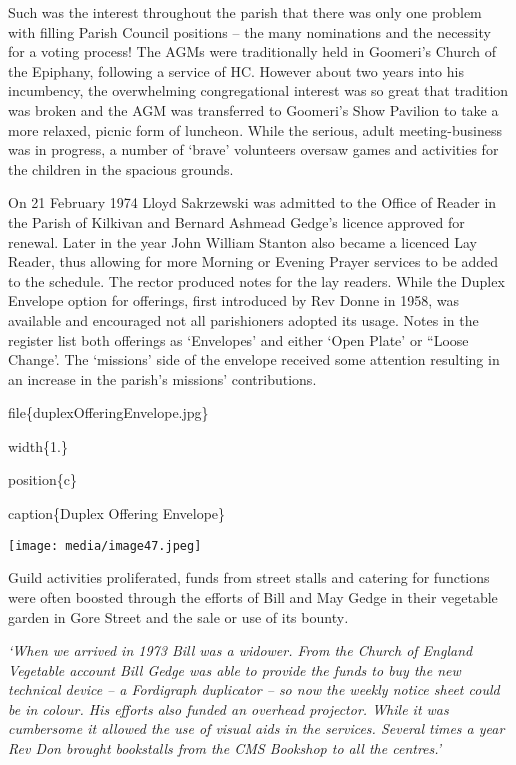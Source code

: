 Such was the interest throughout the parish that there was only one problem with filling Parish Council positions -- the many nominations and the necessity for a voting process! The AGMs were traditionally held in Goomeri's Church of the Epiphany, following a service of HC. However about two years into his incumbency, the overwhelming congregational interest was so great that tradition was broken and the AGM was transferred to Goomeri's Show Pavilion to take a more relaxed, picnic form of luncheon. While the serious, adult meeting-business was in progress, a number of `brave' volunteers oversaw games and activities for the children in the spacious grounds.

On 21 February 1974 Lloyd Sakrzewski was admitted to the Office of Reader in the Parish of Kilkivan and Bernard Ashmead Gedge's licence approved for renewal. Later in the year John William Stanton also became a licenced Lay Reader, thus allowing for more Morning or Evening Prayer services to be added to the schedule. The rector produced notes for the lay readers. While the Duplex Envelope option for offerings, first introduced by Rev Donne in 1958, was available and encouraged not all parishioners adopted its usage. Notes in the register list both offerings as `Envelopes' and either `Open Plate' or ``Loose Change'. The `missions' side of the envelope received some attention resulting in an increase in the parish's missions' contributions.

file\{duplexOfferingEnvelope.jpg\}

width\{1.\}

position\{c\}

caption\{Duplex Offering Envelope\}

\texttt{[image: media/image47.jpeg]}

Guild activities proliferated, funds from street stalls and catering for functions were often boosted through the efforts of Bill and May Gedge in their vegetable garden in Gore Street and the sale or use of its bounty\emph{.}

\emph{`When we arrived in 1973 Bill was a widower. From the Church of England Vegetable account Bill Gedge was able to provide the funds to buy the new technical device -- a Fordigraph duplicator -- so now the weekly notice sheet could be in colour. His efforts also funded an overhead projector. While it was cumbersome it allowed the use of visual aids in the services. Several times a year Rev Don brought bookstalls from the CMS Bookshop to all the centres.'}

